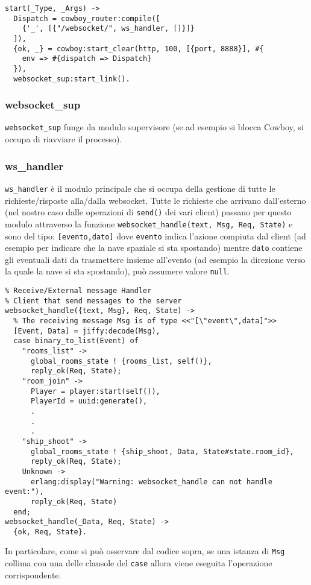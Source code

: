 \documentclass[paper=a4, fontsize=11pt]{scrartcl} %
\numberwithin{equation}{section} %
\numberwithin{figure}{section} %
\numberwithin{table}{section} %
\begin{document}
\lstset{language=erlang}
\begin{lstlisting}
start(_Type, _Args) ->
  Dispatch = cowboy_router:compile([
    {'_', [{"/websocket/", ws_handler, []}]}
  ]),
  {ok, _} = cowboy:start_clear(http, 100, [{port, 8888}], #{
    env => #{dispatch => Dispatch}
  }),
  websocket_sup:start_link().
\end{lstlisting}

\subsubsection{websocket\_sup}
\texttt{websocket\_sup} funge da modulo supervisore (se ad esempio si blocca Cowboy, si occupa di riavviare il processo).
\subsubsection{ws\_handler}
\texttt{ws\_handler} è il modulo principale che si occupa della gestione di tutte le richieste/risposte alla/dalla websocket. Tutte le richieste che arrivano dall'esterno (nel nostro caso dalle operazioni di \texttt{send()} dei vari client) passano per questo modulo attraverso la funzione \texttt{websocket\_handle({text, Msg}, Req, State)} e sono del tipo: \texttt{[evento,dato]} dove \texttt{evento} indica l'azione compiuta dal client (ad esempio per indicare che la nave spaziale si sta spostando) mentre \texttt{dato} contiene gli eventuali dati da trasmettere insieme all'evento (ad esempio la direzione verso la quale la nave si sta spostando), può assumere valore \texttt{null}.
\begin{lstlisting}
% Receive/External message Handler
% Client that send messages to the server
websocket_handle({text, Msg}, Req, State) ->
  % The receiving message Msg is of type <<"[\"event\",data]">>
  [Event, Data] = jiffy:decode(Msg),
  case binary_to_list(Event) of
    "rooms_list" ->
      global_rooms_state ! {rooms_list, self()},
      reply_ok(Req, State);
    "room_join" ->
      Player = player:start(self()),
      PlayerId = uuid:generate(),
	  .
	  .
	  .
    "ship_shoot" ->
      global_rooms_state ! {ship_shoot, Data, State#state.room_id},
      reply_ok(Req, State);
    Unknown ->
      erlang:display("Warning: websocket_handle can not handle event:"),
      reply_ok(Req, State)
  end;
websocket_handle(_Data, Req, State) ->
  {ok, Req, State}.
\end{lstlisting}
In particolare, come si può osservare dal codice sopra, se una istanza di \texttt{Msg} collima con una delle clausole del \texttt{case} allora viene eseguita l'operazione corrispondente.
\end{document}
